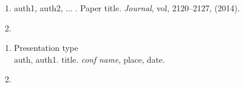 \documentclass[BTech]{iitmdiss}
\begin{document}


\begin{singlespace}

\end{singlespace}



\listofpapers

\begin{enumerate}
\item auth1, auth2, ... . Paper title. {\em Journal}, vol,
2120--2127, (2014).
\item
\end{enumerate}

\begin{enumerate}
\item Presentation type\\ {auth}, auth1. {title}. {\textit{conf name}}, place, date.
\item
\end{enumerate}
\end{document}
